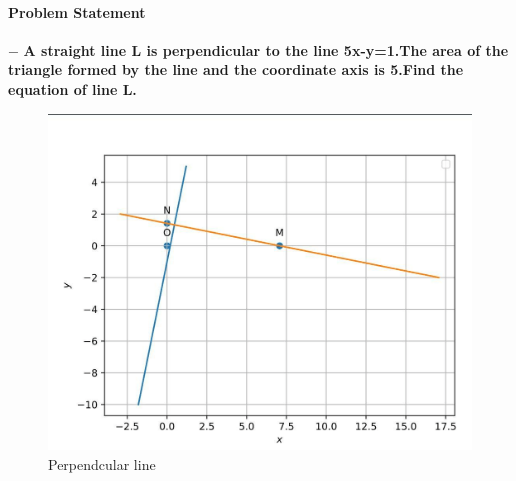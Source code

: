 \documentclass[10pt, a4paper]{article}
\title{\mytitle}
\author{\myauthor\hspace{1em}\\\contact\\FWC22086\hspace{6.5em}IITH\hspace{0.5em}\mymodule\hspace{6em}MATRICES}
\date{}
\begin{document}
 \maketitle
 \paragraph*{\large Problem Statement}
$-$ \textbf{ A straight line L is perpendicular to the line 5x-y=1.The area of the triangle formed by the line and the coordinate axis is 5.Find the equation of line L.}
 
\begin{figure}[h]
\centering
\includegraphics[width=1\columnwidth]{linedg.png}
\caption{Perpendcular line}
\end{figure}
\end{document}

